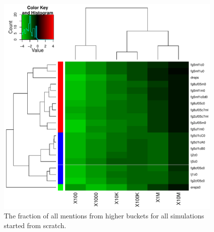 \documentclass[10pt,oneside]{memoir}
\begin{document}
\begin{Spacing}{2}
\begin{figure}
\begin{center}
    \includegraphics{figures/crop/heatmap-b2bm-befr-rel-medians-log10-0wk}
    \caption{The fraction of all mentions from higher buckets for all simulations started from scratch.}
    \label{figure:heatmap-b2bm-befr-rel-medians-0wk}
\end{center}
\end{figure}


\end{Spacing}
\end{document}
